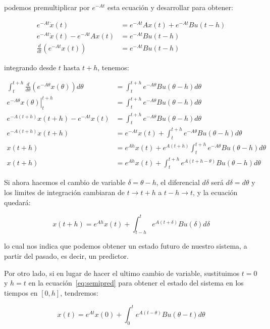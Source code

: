             podemos premultiplicar por $e^{-At}$ esta ecuación y desarrollar para obtener:

            \begin{align*}
                e^{-At} \dot{x}(t) &= e^{-At} A x(t) + e^{-At} B u(t - h) \\
                e^{-At} \dot{x}(t) - e^{-At} A x(t) &= e^{-At} B u(t - h) \\
                \frac{d}{dt} \left( e^{-At} x(t) \right) &= e^{-At} B u(t - h)
            \end{align*}

            integrando desde $t$ hasta $t + h$, tenemos:

            \begin{align} \label{eq:semipred}
                \int_t^{t + h} \frac{d}{d \theta} \left( e^{-A \theta} x( \theta) \right) d\theta &= \int_t^{t + h} e^{-A \theta} B u(\theta - h) d \theta \nonumber \\
                \left. e^{-A \theta} x(\theta) \right|_t^{t + h} &= \int_t^{t + h} e^{-A \theta} B u(\theta - h) d \theta \nonumber \\
                e^{-A (t + h)} x(t + h) - e^{-A t} x(t) &= \int_t^{t + h} e^{-A \theta} B u(\theta - h) d \theta \nonumber \\
                e^{-A (t + h)} x(t + h) &= e^{-A t} x(t) + \int_t^{t + h} e^{-A \theta} B u(\theta - h) d \theta \nonumber \\
                x(t + h) &= e^{A h} x(t) + e^{A (t + h)} \int_t^{t + h} e^{-A \theta} B u(\theta - h) d \theta \nonumber \\
                x(t + h) &= e^{A h} x(t) + \int_t^{t + h} e^{A (t + h - \theta)} B u(\theta - h) d \theta
            \end{align}

            Si ahora hacemos el cambio de variable $\delta = \theta - h$, el diferencial $d \delta$ será $d \delta = d \theta$ y los limites de integración cambiaran de $t \to t + h$ a $t - h \to t$, y la ecuación quedará:

            \begin{equation} \label{eq:pred}
                x(t + h) = e^{A h} x(t) + \int_{t - h}^t e^{A (t + \delta)} B u(\delta) d \delta
            \end{equation}

            lo cual nos indica que podemos obtener un estado futuro de nuestro sistema, a partir del pasado, es decir, un predictor.

            Por otro lado, si en lugar de hacer el ultimo cambio de variable, sustituimos $t = 0$ y $h = t$ en la ecuación~\ref{eq:semipred} para obtener el estado del sistema en los tiempos en $[0, h]$, tendremos:

            \begin{equation}
                x(t) = e^{A t} x(0) + \int_0^t e^{A (t - \theta)} B u(\theta - t) d \theta
            \end{equation}

    
    

